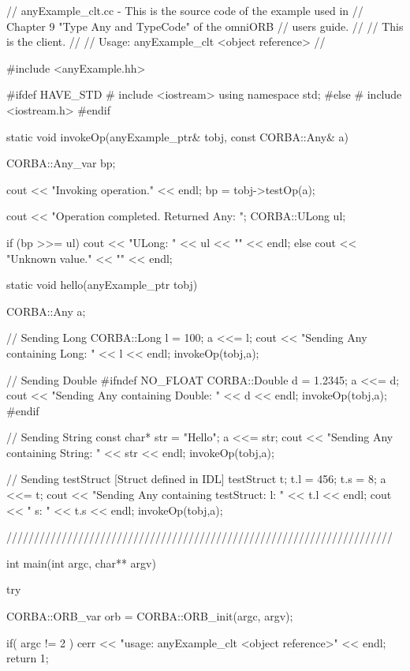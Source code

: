 \documentclass[11pt,twoside,a4paper]{book}
\begin{document}
\begin{cxxlisting}
// anyExample_clt.cc -  This is the source code of the example used in 
//                      Chapter 9 "Type Any and TypeCode" of the omniORB
//                      users guide.
//
//                      This is the client.
//
// Usage: anyExample_clt <object reference>
//

#include <anyExample.hh>

#ifdef HAVE_STD
#  include <iostream>
   using namespace std;
#else
#  include <iostream.h>
#endif


static void invokeOp(anyExample_ptr& tobj, const CORBA::Any& a)
{
  CORBA::Any_var bp;

  cout << "Invoking operation." << endl;
  bp = tobj->testOp(a);

  cout << "Operation completed. Returned Any: ";
  CORBA::ULong ul;

  if (bp >>= ul) {
    cout << "ULong: " << ul << "\n" << endl;
  }
  else {
    cout << "Unknown value." << "\n" << endl;
  }
}


static void hello(anyExample_ptr tobj)
{
  CORBA::Any a;

  // Sending Long
  CORBA::Long l = 100;
  a <<= l;
  cout << "Sending Any containing Long: " << l << endl; 
  invokeOp(tobj,a);
    
  // Sending Double
#ifndef NO_FLOAT
  CORBA::Double d = 1.2345;
  a <<= d;
  cout << "Sending Any containing Double: " << d << endl; 
  invokeOp(tobj,a);
#endif
  
  // Sending String
  const char* str = "Hello";
  a <<= str;
  cout << "Sending Any containing String: " << str << endl;
  invokeOp(tobj,a);
    
  // Sending testStruct  [Struct defined in IDL]
  testStruct t;
  t.l = 456;
  t.s = 8;
  a <<= t;
  cout << "Sending Any containing testStruct: l: " << t.l << endl;
  cout << "                                   s: " << t.s << endl;
  invokeOp(tobj,a);
}

//////////////////////////////////////////////////////////////////////

int main(int argc, char** argv)
{
  try {
    CORBA::ORB_var orb = CORBA::ORB_init(argc, argv);

    if( argc != 2 ) {
      cerr << "usage:  anyExample_clt <object reference>" << endl;
      return 1;
    }

}}
\end{cxxlisting}
\end{document}
